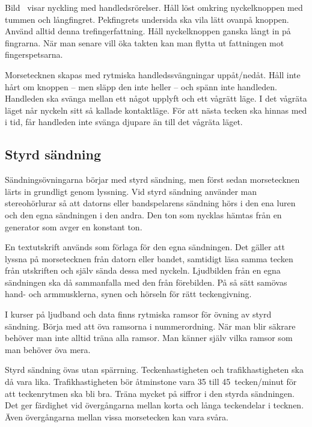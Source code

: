 
Bild~ visar nyckling med handledsrörelser.
Håll löst omkring nyckelknoppen med tummen och långfingret.
Pekfingrets undersida ska vila lätt ovanpå knoppen.
Använd alltid denna trefingerfattning.
Håll nyckelknoppen ganska långt in på fingrarna.
När man senare vill öka takten kan man flytta ut fattningen mot fingerspetsarna.

Morsetecknen skapas med rytmiska handledssvängningar uppåt/nedåt.
Håll inte hårt om knoppen -- men släpp den inte heller -- och spänn inte
handleden.
Handleden ska svänga mellan ett något upplyft och ett vågrätt läge.
I det vågräta läget når nyckeln sitt så kallade kontaktläge.
För att nästa tecken ska hinnas med i tid, får handleden inte svänga djupare än
till det vågräta läget.

\subsection{Styrd sändning}

Sändningsövningarna börjar med styrd sändning, men först sedan morsetecknen
lärts in grundligt genom lyssning.
Vid styrd sändning använder man stereohörlurar så att datorns eller
bandspelarens sändning hörs i den ena luren och den egna sändningen i den andra.
Den ton som nycklas hämtas från en generator som avger en konstant ton.

En textutskrift används som förlaga för den egna sändningen.
Det gäller att lyssna på morsetecknen från datorn eller bandet, samtidigt läsa
samma tecken från utskriften och själv sända dessa med nyckeln.
Ljudbilden från en egna sändningen ska då sammanfalla med den från förebilden.
På så sätt samövas hand- och armmusklerna, synen och hörseln för rätt
teckengivning.

I kurser på ljudband och data finns rytmiska ramsor för övning av styrd
sändning.
Börja med att öva ramsorna i nummerordning.
När man blir säkrare behöver man inte alltid träna alla ramsor.
Man känner själv vilka ramsor som man behöver öva mera.

Styrd sändning övas utan spärrning.
Teckenhastigheten och trafikhastigheten ska då vara lika.
Trafikhastigheten bör åtminstone vara 35 till 45~tecken/minut för att
teckenrytmen ska bli bra.
Träna mycket på siffror i den styrda sändningen.
Det ger färdighet vid övergångarna mellan korta och långa teckendelar i tecknen.
Även övergångarna mellan vissa morsetecken kan vara svåra.

